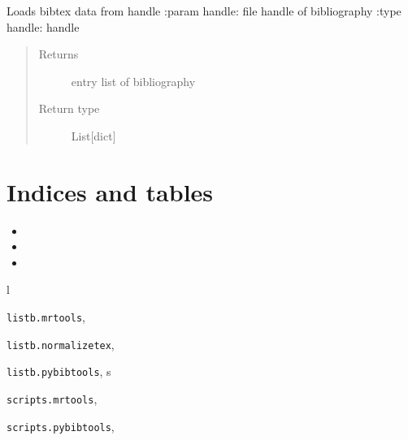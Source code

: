 \documentclass[letterpaper,10pt,english]{sphinxmanual}
\begin{document}

\begin{fulllineitems}
\label{modules/pybibtools:listb.pybibtools.bibtex_load_list}
Loads bibtex data from handle
:param handle: file handle of bibliography
:type handle: handle
\begin{quote}\begin{description}
\item[{Returns}] \leavevmode
entry list of bibliography

\item[{Return type}] \leavevmode
List{[}dict{]}

\end{description}\end{quote}

\end{fulllineitems}



\chapter{Indices and tables}
\label{index:indices-and-tables}\begin{itemize}
\item {} 

\item {} 

\item {} 

\end{itemize}


\renewcommand{\indexname}{Python Module Index}
\begin{theindex}
\def\bigletter#1{{\Large\sffamily#1}\nopagebreak\vspace{1mm}}
\bigletter{l}
\item {\texttt{listb.mrtools}}, \pageref{modules/mrtools:module-listb.mrtools}
\item {\texttt{listb.normalizetex}}, \pageref{modules/normalizetex:module-listb.normalizetex}
\item {\texttt{listb.pybibtools}}, \pageref{modules/pybibtools:module-listb.pybibtools}
\indexspace
\bigletter{s}
\item {\texttt{scripts.mrtools}}, \pageref{scripts/mrtools:module-scripts.mrtools}
\item {\texttt{scripts.pybibtools}}, \pageref{scripts/pybibtools:module-scripts.pybibtools}
\end{theindex}

\renewcommand{\indexname}{Index}
\printindex
\end{document}
